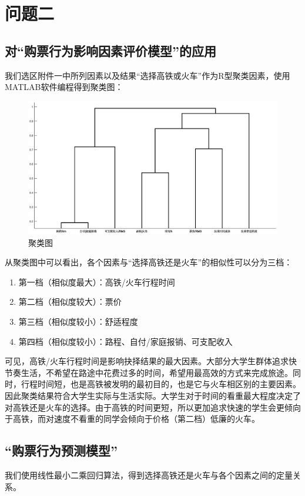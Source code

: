\documentclass{ctexart}
\newcounter{sub}
\begin{document}
\section{问题二}%
\label{sec:问题二}
\subsection{对\enquote{购票行为影响因素评价模型}的应用}

我们选区附件一中所列因素以及结果\enquote{选择高铁或火车}作为R型聚类因素，使用MATLAB软件编程得到聚类图：
\renewcommand\figurename{图}
\begin{figure}[H]
	\centering
	\includegraphics[width=.8\linewidth]{R.eps}
	\caption{聚类图} \label{all}
\end{figure}

从聚类图中可以看出，各个因素与\enquote{选择高铁还是火车}的相似性可以分为三档：
\begin{enumerate}
	\item 第一档（相似度最大）：高铁/火车行程时间
	\item 第二档（相似度较大）：票价
	\item 第三档（相似度较小）：舒适程度
	\item 第四档（相似度较小）：路程、自付/家庭报销、可支配收入
\end{enumerate}

可见，高铁/火车行程时间是影响抉择结果的最大因素。大部分大学生群体追求快节奏生活，不希望在路途中花费过多的时间，希望用最高效的方式来完成旅途。同时，行程时间短，也是高铁被发明的最初目的，也是它与火车相区别的主要因素。因此聚类结果符合大学生实际与生活实际。大学生对于时间的看重最大程度决定了对高铁还是火车的选择。由于高铁的时间更短，所以更加追求快速的学生会更倾向于高铁，而对速度不看重的同学会倾向于价格（第二档）低廉的火车。

\subsection{\enquote{购票行为预测模型}}
我们使用线性最小二乘回归算法，得到选择高铁还是火车与各个因素之间的定量关系。
\end{document}
